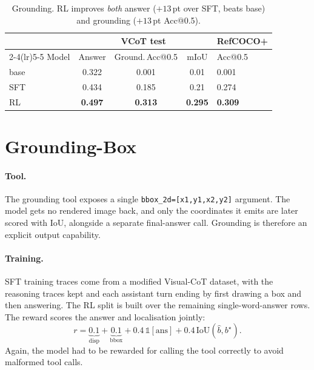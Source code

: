 \documentclass[10pt,twocolumn]{article}
\newcommand{\code}[1]{\texttt{\small #1}}
\begin{document}
\begin{table}[t]
\centering\small
\begin{tabular}{lcccl}
\toprule
& \multicolumn{3}{c}{VCoT test} & RefCOCO+ \\
\cmidrule(lr){2-4}\cmidrule(lr){5-5}
Model & Answer & Ground.\,Acc@0.5 & mIoU & Acc@0.5 \\
\midrule
base & 0.322 & 0.001 & 0.01 & 0.001 \\
SFT  & 0.434 & 0.185 & 0.21 & 0.274 \\
RL   & \textbf{0.497} & \textbf{0.313} & \textbf{0.295} & \textbf{0.309} \\
\bottomrule
\end{tabular}
\caption{Grounding. RL improves \emph{both} answer ($+13$\,pt over SFT, beats
base) and grounding ($+13$\,pt Acc@0.5).}
\label{tab:ground}
\end{table}

\section*{Grounding-Box}
\label{sec:ground}
\paragraph{Tool.} The grounding tool exposes a single \code{bbox\_2d=[x1,y1,x2,y2]}
argument. The model gets no
rendered image back, and only the coordinates it emits are later scored with IoU,
alongside a separate final-answer call. Grounding is therefore an explicit output
capability.

\paragraph{Training.} SFT training traces come from a modified Visual-CoT dataset, with the reasoning traces kept and each
assistant turn ending by first drawing a box and then answering. The RL split is
built over the remaining single-word-answer rows. The reward scores the answer and localisation jointly:
\[
r = \underbrace{0.1}_{\text{disp}} + \underbrace{0.1}_{\text{bbox}} + 0.4\,\mathbb{1}[\text{ans}] + 0.4\,\mathrm{IoU}(\hat b, b^{\star}).
\]
Again, the model had to be rewarded for calling the tool correctly to avoid malformed tool calls.
\end{document}
